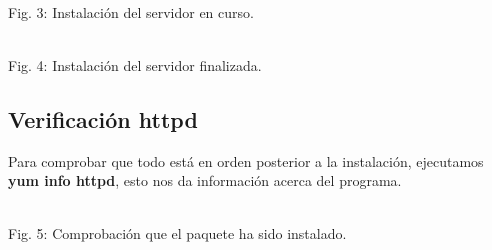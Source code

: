 \documentclass[11pt]{article}
\begin{document}
\begin{minipage}[t]{\linewidth}
    \raggedright
\medskip
     \\Fig. 3: Instalación del servidor en curso.\\
\end{minipage}

\begin{minipage}[t]{\linewidth}
    \raggedright
\medskip
     \\Fig. 4: Instalación del servidor finalizada.\\
\end{minipage}

\subsection{Verificación httpd}
Para comprobar que todo está en orden posterior a la instalación, ejecutamos \textbf{yum info httpd}, esto nos da información acerca del programa.\\

\begin{minipage}[t]{\linewidth}
    \raggedright
\medskip
     \\Fig. 5: Comprobación que el paquete ha sido instalado.\\
\end{minipage}
\end{document}
